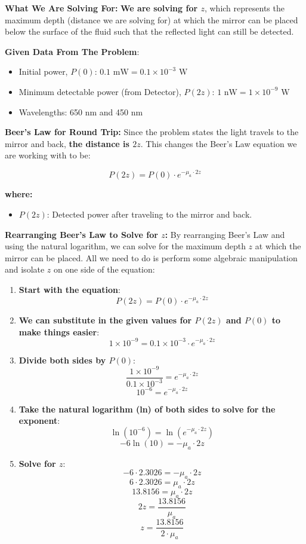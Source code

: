 \documentclass[12pt]{article}
\begin{document}
\textbf{What We Are Solving For:}
\textbf{We are solving for \( z \)}, which represents the maximum depth (distance we are solving for) at which the mirror can be placed below the surface of the fluid such that the reflected light can still be detected.


\textbf{Given Data From The Problem}:
\begin{itemize}
    \item Initial power, \( P(0) \): \( 0.1 \text{ mW} = 0.1 \times 10^{-3} \text{ W} \)
    \item Minimum detectable power (from Detector), \( P(2z) \): \( 1 \text{ nW} = 1 \times 10^{-9} \text{ W} \)
    \item Wavelengths: 650 nm and 450 nm
\end{itemize}

\textbf{Beer's Law for Round Trip:}
Since the problem states the light travels to the mirror and back, \textbf{the distance is \( 2z \)}. This changes the Beer's Law equation we are working with to be:

\[ P(2z) = P(0) \cdot e^{-\mu_a \cdot 2z} \]

\textbf{where:}
\begin{itemize}
    \item \( P(2z) \): Detected power after traveling to the mirror and back.
\end{itemize}

\textbf{Rearranging Beer's Law to Solve for \( z \):}
By rearranging Beer's Law and using the natural logarithm, we can solve for the maximum depth \( z \) at which the mirror can be placed. All we need to do is perform some algebraic manipulation and isolate \( z \) on one side of the equation:

\begin{enumerate}
    \item \textbf{Start with the equation}:
    \[ P(2z) = P(0) \cdot e^{-\mu_a \cdot 2z} \]

    \item \textbf{ We can substitute in the given values for \( P(2z) \) and \( P(0) \) to make things easier}:
    \[ 1 \times 10^{-9} = 0.1 \times 10^{-3} \cdot e^{-\mu_a \cdot 2z} \]

    \item \textbf{Divide both sides by \( P(0) \)}:
    \[ \frac{1 \times 10^{-9}}{0.1 \times 10^{-3}} = e^{-\mu_a \cdot 2z} \]
    \[ 10^{-6} = e^{-\mu_a \cdot 2z} \]

    \item \textbf{Take the natural logarithm (ln) of both sides to solve for the exponent}:
    \[ \ln(10^{-6}) = \ln(e^{-\mu_a \cdot 2z}) \]
    \[ -6 \ln(10) = -\mu_a \cdot 2z \]

    \item \textbf{Solve for \( z \)}:
    \[ -6 \cdot 2.3026 = -\mu_a \cdot 2z \]
    \[ 6 \cdot 2.3026 = \mu_a \cdot 2z \]
    \[ 13.8156 = \mu_a \cdot 2z \]
    \[ 2z = \frac{13.8156}{\mu_a} \]
    \[ z = \frac{13.8156}{2 \cdot \mu_a} \]
\end{enumerate}
\end{document}
